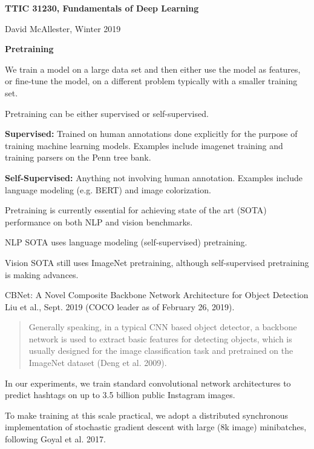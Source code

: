 





{\Huge
  \centerline{\bf TTIC 31230,  Fundamentals of Deep Learning}
  \vfill
  \centerline{David McAllester, Winter 2019}
  \vfill
  \centerline{\bf Pretraining}



We train a model on a large data set and then either use the model as features, or fine-tune the model, on a different problem typically with a smaller training set.

Pretraining can be either supervised or self-supervised.

\vfill
{\bf Supervised:} Trained on human annotations
done explicitly for the purpose of training machine learning models.  Examples include imagenet training
and training parsers on the Penn tree bank.

\vfill
{\bf Self-Supervised:} Anything not involving human annotation. Examples include language modeling (e.g. BERT) and  image colorization.


Pretraining is currently essential for achieving state of the art (SOTA) performance on both NLP and vision benchmarks.

\vfill
NLP SOTA uses language modeling (self-supervised) pretraining.

\vfill
Vision SOTA still uses ImageNet pretraining, although self-supervised pretraining is making advances.


CBNet: A Novel Composite Backbone Network Architecture for Object Detection
Liu et al., Sept. 2019 (COCO leader as of February 26, 2019).

\vfill
\begin{quotation}
Generally speaking, in a typical CNN based object detector, a backbone network is used to extract basic features for detecting objects, which is usually designed for
the image classification task and pretrained on the ImageNet
dataset (Deng et al. 2009).
\end{quotation}


In our experiments, we train standard convolutional network architectures to
predict hashtags on up to 3.5 billion public Instagram images.

\vfill
To make training at this scale practical, we adopt a distributed synchronous implementation of
stochastic gradient descent with large (8k image) minibatches, following Goyal et al. 2017.

}
